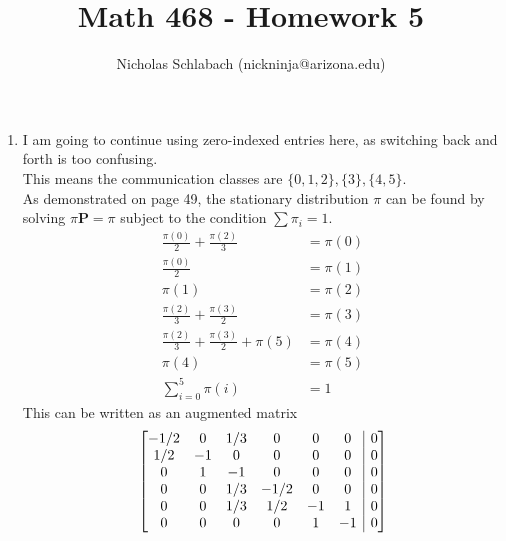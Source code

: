 \documentclass[14pt,letterpaper]{extarticle}
\title{Math 468 - Homework 5}
\author{Nicholas Schlabach (nickninja@arizona.edu)}
\date{\DTMUsedate{titledate}}
\makeatletter
\newcommand*{\bP}{\mathbf{P}}
\newenvironment{amatrix}[1]{%
  \left[\begin{array}{@{}*{#1}{c}|c@{}}
}{%
  \end{array}\right]
}
\makeatother
\begin{document}
\pagestyle{fancy}
\fancyhead[C]{\hspace{5mm}\Big(\thetitle{}\Big)}
\fancyfoot{} %
\maketitle
\thispagestyle{fancy}


\begin{center}
\begin{enumerate}
\item

    I am going to continue using zero-indexed entries here, as switching back and forth is too confusing. \\
    This means the communication classes are $\{0,1,2\}, \{3\}, \{4,5\}$. \\
    As demonstrated on page 49, the stationary distribution $\pi$ can be found by solving $\pi\bP=\pi$ subject to the condition $\sum \pi_i=1$.
    \begin{align*}
        \frac{\pi(0)}{2}+\frac{\pi(2)}{3} & =\pi(0) \\
        \frac{\pi(0)}{2}& =\pi(1) \\
        \pi(1) &= \pi(2)  \\
        \frac{\pi(2)}{3}+\frac{\pi(3)}{2}& =\pi(3) \\
        \frac{\pi(2)}{3} +\frac{\pi(3)}{2}+\pi(5)&=\pi(4)  \\
        \pi(4)& =\pi(5) \\
        \sum_{i=0}^5 \pi(i) & =1
    \end{align*}
    This can be written as an augmented matrix 
    \[ \begin{amatrix}{6}
        -1/2 & 0 & 1/3 & 0 & 0 & 0 & 0 \\
        1/2 & -1 & 0 & 0 & 0 & 0& 0 \\
        0 & 1 & -1 & 0 & 0 & 0 &0 \\
        0 & 0 & 1/3 & -1/2 & 0 &0 & 0 \\
        0 & 0 & 1/3 & 1/2 & -1 & 1 &0 \\
        0 & 0 & 0 & 0 & 1 & -1 & 0 \\

\end{amatrix}\]
\end{enumerate}
\end{center}
\end{document}
